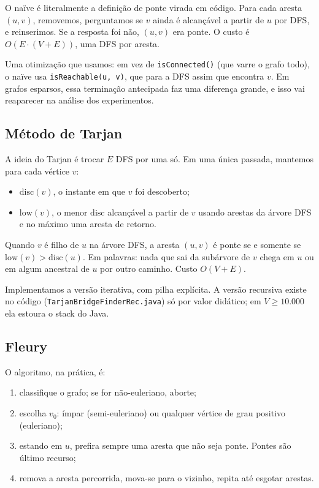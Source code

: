 \documentclass[a4paper,11pt]{article}
\begin{document}
O naïve é literalmente a definição de ponte virada em código. Para cada aresta $(u,v)$, removemos, perguntamos se $v$ ainda é alcançável a partir de $u$ por DFS, e reinserimos. Se a resposta foi não, $(u,v)$ era ponte. O custo é $O(E \cdot (V+E))$, uma DFS por aresta.

Uma otimização que usamos: em vez de \texttt{isConnected()} (que varre o grafo todo), o naïve usa \texttt{isReachable(u, v)}, que para a DFS assim que encontra $v$. Em grafos esparsos, essa terminação antecipada faz uma diferença grande, e isso vai reaparecer na análise dos experimentos.

\subsection{Método de Tarjan}

A ideia do Tarjan é trocar $E$ DFS por uma só. Em uma única passada, mantemos para cada vértice $v$:
\begin{itemize}
    \item $\mathrm{disc}(v)$, o instante em que $v$ foi descoberto;
    \item $\mathrm{low}(v)$, o menor $\mathrm{disc}$ alcançável a partir de $v$ usando arestas da árvore DFS e no máximo uma aresta de retorno.
\end{itemize}

Quando $v$ é filho de $u$ na árvore DFS, a aresta $(u,v)$ é ponte se e somente se $\mathrm{low}(v) > \mathrm{disc}(u)$. Em palavras: nada que sai da subárvore de $v$ chega em $u$ ou em algum ancestral de $u$ por outro caminho. Custo $O(V+E)$.

Implementamos a versão iterativa, com pilha explícita. A versão recursiva existe no código (\texttt{TarjanBridgeFinderRec.java}) só por valor didático; em $V \geq 10.000$ ela estoura o stack do Java.

\subsection{Fleury}

O algoritmo, na prática, é:
\begin{enumerate}
    \item classifique o grafo; se for não-euleriano, aborte;
    \item escolha $v_0$: ímpar (semi-euleriano) ou qualquer vértice de grau positivo (euleriano);
    \item estando em $u$, prefira sempre uma aresta que não seja ponte. Pontes são último recurso;
    \item remova a aresta percorrida, mova-se para o vizinho, repita até esgotar arestas.
\end{enumerate}
\end{document}
